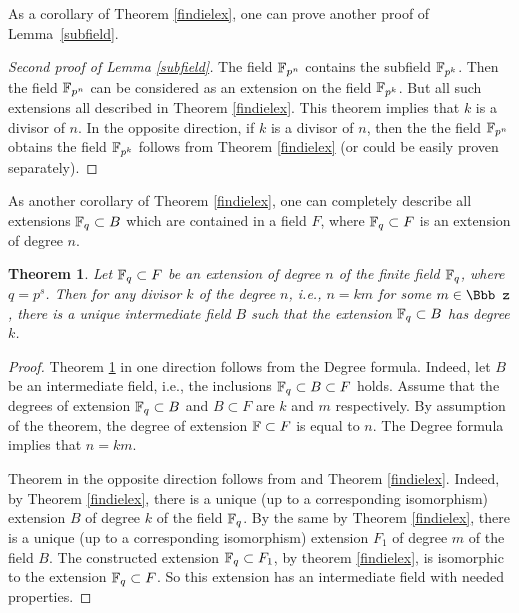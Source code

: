 \documentclass[11pt]{article}
\theoremstyle{plain}
\newtheorem{theorem}{Theorem}[section]
\theoremstyle{definition}
\begin{document}
As a corollary of Theorem \ref {findielex}, one can prove another proof of Lemma~\ref{subfield}.

\begin{proof}[Second proof  of Lemma \ref{subfield}]
The field $\Bbb F_{p^n}$ contains the subfield $\Bbb F_{p^k}$. Then the field $\Bbb F_{p^n}$ can be considered as an extension on the field $\Bbb F_{p^k}$. But all such extensions all described in Theorem \ref{findielex}. This theorem implies that $k$ is a divisor of $n$. In the opposite direction, if $k$ is a divisor of $n$, then the the field $\Bbb F_{p^n}$ obtains the field $\Bbb F_{p^k}$ follows from Theorem \ref{findielex} (or could be easily proven separately).
\end{proof}

As another  corollary of Theorem \ref {findielex}, one can
completely describe all extensions $\Bbb F_q\subset B$ which are contained in a field $F$, where $\Bbb F_q\subset F$ is an extension of degree $n$.

\begin{theorem}\label{cordeq} Let $\Bbb F_q\subset F$ be an extension of degree $n$ of the finite field $\Bbb F_q$, where $q=p^s$.
 Then for any divisor $k$ of the degree $n$, i.e., $n=km$ for some $m\in \Bbb z$,  there is a unique  intermediate field $B$
 such that the extension $\Bbb F_q\subset B$ has degree $k$.
 \end{theorem}

 \begin{proof} Theorem \ref{cordeq} in one direction follows from the Degree formula.  Indeed, let $B$ be an intermediate  field, i.e., the inclusions $\Bbb F_q\subset B \subset F$ holds. Assume that the degrees of extension $\Bbb F_q\subset B$ and $B\subset F$ are $k$ and $m$ respectively. By assumption  of the theorem, the degree of extension $\Bbb F\subset F$ is equal to $n$. The Degree formula implies that $n=km$.

 Theorem in the opposite direction follows from and Theorem \ref{findielex}. Indeed, by Theorem \ref{findielex},  there is a unique (up to a corresponding isomorphism) extension $B$ of degree $k$ of the field  $\Bbb F_q$. By the same  by Theorem \ref{findielex}, there is a unique (up to a corresponding isomorphism) extension $F_1$ of degree $m$ of the field $B$. The constructed extension $\Bbb F_q \subset F_1$, by theorem \ref{findielex}, is isomorphic to the extension $\Bbb F_q\subset F$. So this extension has an intermediate field with needed properties.
  \end{proof}
\end{document}
